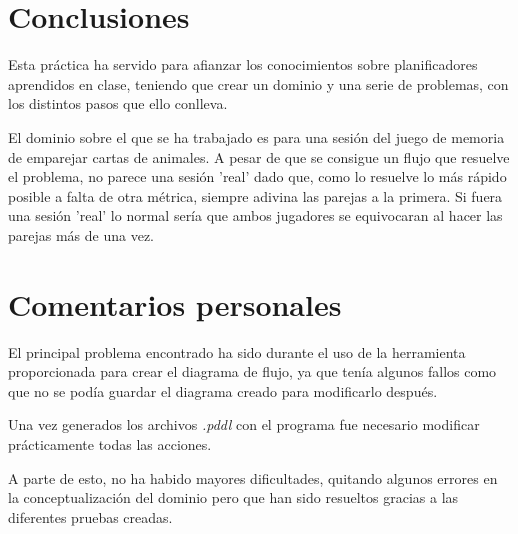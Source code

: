\documentclass{uc3mpracticas}
\begin{document}
  \newpage


  \section{Conclusiones}

  Esta práctica ha servido para afianzar los conocimientos sobre planificadores aprendidos en clase, teniendo que crear un dominio y una serie de problemas, con los distintos pasos que ello conlleva.

  \vspace{2mm}

  El dominio sobre el que se ha trabajado es para una sesión del juego de memoria de emparejar cartas de animales. A pesar de que se consigue un flujo que resuelve el problema, no parece una sesión 'real' dado que, como lo resuelve lo más rápido posible a falta de otra métrica, siempre adivina las parejas a la primera. Si fuera una sesión 'real' lo normal sería que ambos jugadores se equivocaran al hacer las parejas más de una vez.

  \section{Comentarios personales}

  El principal problema encontrado ha sido durante el uso de la herramienta proporcionada para crear el diagrama de flujo, ya que tenía algunos fallos como que no se podía guardar el diagrama creado para modificarlo después.

  \vspace{2mm}

  Una vez generados los archivos \textit{.pddl} con el programa fue necesario modificar prácticamente todas las acciones.

  \vspace{2mm}

  A parte de esto, no ha habido mayores dificultades, quitando algunos errores en la conceptualización del dominio pero que han sido resueltos gracias a las diferentes pruebas creadas.
\end{document}
